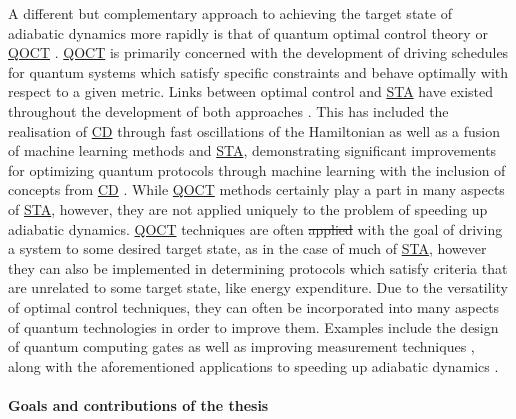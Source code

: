 \documentclass[a4paper,oneside,11pt]{book}
\newcommand{\acrref}[1]{\hyperref[acr:#1]{#1}}
\providecommand{\DIFaddtex}[1]{{\protect\color{blue}\uwave{#1}}} %
\providecommand{\DIFdeltex}[1]{{\protect\color{red}\sout{#1}}}                      %
\providecommand{\DIFaddbegin}{} %
\providecommand{\DIFaddend}{} %
\providecommand{\DIFdelbegin}{} %
\providecommand{\DIFdelend}{} %
\providecommand{\DIFadd}[1]{\texorpdfstring{\DIFaddtex{#1}}{#1}} %
\providecommand{\DIFdel}[1]{\texorpdfstring{\DIFdeltex{#1}}{}} %
\newcommand{\DIFscaledelfig}{0.5}
\newlength{\DIFdelgraphicswidth} %
\newlength{\DIFdelgraphicsheight} %
\newcommand{\DIFaddincludegraphics}[2][]{{\color{blue}\fbox{\DIFOincludegraphics[#1]{#2}}}} %
\newcommand{\DIFdelincludegraphics}[2][]{%
\sbox{\DIFdelgraphicsbox}{\DIFOincludegraphics[#1]{#2}}%
\settoboxwidth{\DIFdelgraphicswidth}{\DIFdelgraphicsbox} %
\settoboxtotalheight{\DIFdelgraphicsheight}{\DIFdelgraphicsbox} %
\scalebox{\DIFscaledelfig}{%
\parbox[b]{\DIFdelgraphicswidth}{\usebox{\DIFdelgraphicsbox}\\[-\baselineskip] \rule{\DIFdelgraphicswidth}{0em}}\llap{\resizebox{\DIFdelgraphicswidth}{\DIFdelgraphicsheight}{%
\setlength{\unitlength}{\DIFdelgraphicswidth}%
\begin{picture}(1,1)%
\thicklines\linethickness{2pt} %
{\color[rgb]{1,0,0}\put(0,0){\framebox(1,1){}}}%
{\color[rgb]{1,0,0}\put(0,0){\line( 1,1){1}}}%
{\color[rgb]{1,0,0}\put(0,1){\line(1,-1){1}}}%
\end{picture}%
}\hspace*{3pt}}} %
} %
\DeclareRobustCommand{\DIFaddbegin}{\DIFOaddbegin \let\includegraphics\DIFaddincludegraphics} %
\DeclareRobustCommand{\DIFaddend}{\DIFOaddend \let\includegraphics\DIFOincludegraphics} %
\DeclareRobustCommand{\DIFdelbegin}{\DIFOdelbegin \let\includegraphics\DIFdelincludegraphics} %
\DeclareRobustCommand{\DIFdelend}{\DIFOaddend \let\includegraphics\DIFOincludegraphics} %
\begin{document}
A different but complementary approach to achieving the target state of adiabatic dynamics more rapidly is that of quantum optimal control theory or \acrref{QOCT} \cite{glaser_training_2015, koch_quantum_2022}. \acrref{QOCT} is primarily concerned with the development of driving schedules for quantum systems which satisfy specific constraints and behave optimally with respect to a given metric. Links between optimal control and \acrref{STA} have existed throughout the development of both approaches \cite{stefanatos_frictionless_2010, stefanatos_shortcut_2021, zhang_connection_2021}. This has included the realisation of \acrref{CD} through fast oscillations of the Hamiltonian \cite{petiziol_accelerated_2020, petiziol_fast_2018} as well as a fusion of machine learning methods and \acrref{STA}, demonstrating significant improvements for optimizing quantum protocols through machine learning with the inclusion of concepts from \acrref{CD} \cite{bukov_reinforcement_2018, yao_reinforcement_2021, khait_optimal_2022}. While \acrref{QOCT} methods certainly play a part in many aspects of \acrref{STA}, however, they are not applied uniquely to the problem of speeding up adiabatic dynamics. \acrref{QOCT} techniques are often \DIFdelbegin \DIFdel{applied }\DIFdelend \DIFaddbegin \DIFadd{implemented }\DIFaddend with the goal of driving a system to some desired target state, as in the case of much of \acrref{STA}, however they can also be implemented in determining protocols which satisfy criteria that are unrelated to some target state, like energy expenditure. Due to the versatility of optimal control techniques, they can often be incorporated into many aspects of quantum technologies in order to improve them. Examples include the design of quantum computing gates \cite{pelegri_high-fidelity_2022} as well as improving measurement techniques \cite{wiseman_quantum_2009}, along with the aforementioned applications to speeding up adiabatic dynamics \cite{guery-odelin_shortcuts_2019}.


\paragraph*{Goals and contributions of the thesis}
\end{document}
